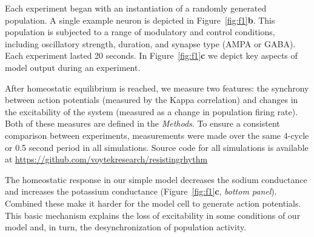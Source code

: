 \documentclass{article}
\begin{document}
Each experiment began with an instantiation of a randomly generated population. A single example neuron is depicted in Figure~\ref{fig:f1}\textbf{b}. This population is subjected to a range of modulatory and control conditions, including oscillatory strength, duration, and synapse type (AMPA or GABA). Each experiment lasted 20 seconds. In Figure~\ref{fig:f1}\textbf{c} we depict key aspects of model output during an experiment. 

After homeostatic equilibrium is reached, we measure two features: the synchrony between action potentials (measured by the Kappa correlation) and changes in the excitability of the system (measured as a change in population firing rate). Both of these measures are defined in the \textit{Methods}. To ensure a consistent comparison between experiments, measurements were made over the same 4-cycle or 0.5 second period in all simulations. Source code for all simulations is available at \url{https://github.com/voytekresearch/resistingrhythm}

The homeostatic response in our simple model decreases the sodium conductance and increases the potassium conductance (Figure~\ref{fig:f1}\textbf{c}, \textit{bottom panel}). Combined these make it harder for the model cell to generate action potentials. This basic mechanism explains the loss of excitability in some conditions of our model and, in turn, the desynchronization of population activity. 
\end{document}
